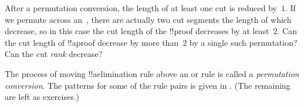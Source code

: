 \documentclass[../../../include/open-logic-section]{subfiles}
\begin{document}
\begin{prob}
After a permutation conversion, the length of at least one cut is
reduced by~$1$. If we permute \Elim{\land} across an~\Elim{\lor},
there are actually two cut segments the length of which decrease, so
in this case the cut length of the !!{proof} decreases by at
least~$2$. Can the cut length of !!a{proof} decrease by more than~$2$
by a single such permutation? Can the cut \emph{rank} decrease?
\end{prob}

The process of moving !!a{elimination} rule above an \Elim{\lor} or
\Elim{\lexists} rule is called a \emph{permutation conversion}. The
patterns for some of the rule pairs is given in
. (The remaining are left as
exercises.) 

\end{document}
